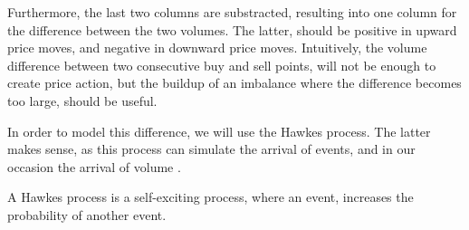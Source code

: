 Furthermore, the last two columns are substracted, resulting into one column for the difference between the two volumes. The latter, should be positive in upward price moves, and negative in downward price moves. Intuitively, the volume difference between two consecutive buy and sell points, will not be enough to create price action, but the buildup of an imbalance where the difference becomes too large, should be useful. 

In order to model this difference, we will use the Hawkes process. The latter makes sense, as this process can simulate the arrival of events, and in our occasion the arrival of volume \cite{Hawkes}. 

A Hawkes process is a self-exciting process, where an event, increases the probability of another event.


